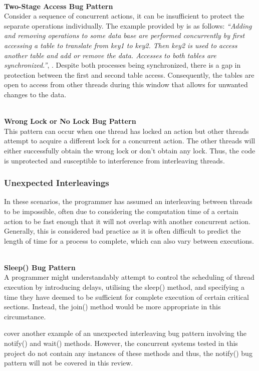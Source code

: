 \documentclass[a4paper,12pt]{article}
\begin{document}
\textbf{\\Two-Stage Access Bug Pattern}
\\Consider a sequence of concurrent actions, it can be insufficient to protect the separate operations individually. The example provided by \citet{farchi03} is as follows: \textit{“Adding and removing operations to some data base are performed concurrently by first accessing a table to translate from key1 to key2. Then key2 is used to access another table and add or remove the data. Accesses to both tables are synchronized.”}, \citep{farchi03}. Despite both processes being synchronized, there is a gap in protection between the first and second table access. Consequently, the tables are open to access from other threads during this window that allows for unwanted changes to the data.

\textbf{\\Wrong Lock or No Lock Bug Pattern}
\\This pattern can occur when one thread has locked an action but other threads attempt to acquire a different lock for a concurrent action. The other threads will either successfully obtain the wrong lock or don’t obtain any lock. Thus, the code is unprotected and susceptible to interference from interleaving threads.


\subsubsection{Unexpected Interleavings}

In these scenarios, the programmer has assumed an interleaving between threads to be impossible, often due to considering the computation time of a certain action to be fast enough that it will not overlap with another concurrent action. Generally, this is considered bad practice as it is often difficult to predict the length of time for a process to complete, which can also vary between executions. 

\textbf{\\Sleep() Bug Pattern}
\\A programmer might understandably attempt to control the scheduling of thread execution by introducing delays, utilising the sleep() method, and specifying a time they have deemed to be sufficient for complete execution of certain critical sections. Instead, the join() method would be more appropriate in this circumstance.

\citet{farchi03} cover another example of an unexpected interleaving bug pattern involving the notify() and wait() methods. However, the concurrent systems tested in this project do not contain any instances of these methods and thus, the notify() bug pattern will not be covered in this review.   
\end{document}
